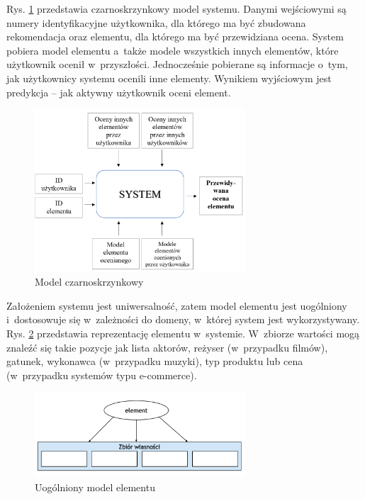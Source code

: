 \documentclass[twoside]{iisthesis}
\begin{document}
	Rys. \ref{fig:blackbox} przedstawia czarnoskrzynkowy model systemu. Danymi wejściowymi są numery identyfikacyjne użytkownika, dla którego ma być zbudowana rekomendacja oraz elementu, dla którego ma być przewidziana ocena. System pobiera model elementu a~także modele wszystkich innych elementów, które użytkownik ocenił w~przyszłości. Jednocześnie pobierane są informacje o~tym, jak użytkownicy systemu ocenili inne elementy. Wynikiem wyjściowym jest predykcja -- jak aktywny użytkownik oceni element.
	
	\begin{figure}[!ht] 
		\centering
		\includegraphics[width=0.7\textwidth]{blackbox}
		\caption{Model czarnoskrzynkowy}
		\label{fig:blackbox}
	\end{figure}
	
	Założeniem systemu jest uniwersalność, zatem model elementu jest uogólniony i~dostosowuje się w~zależności do domeny, w~której system jest wykorzystywany. Rys. \ref{fig:modelElementu} przedstawia reprezentację elementu w~systemie. W~zbiorze wartości mogą znaleźć się takie pozycje jak lista aktorów, reżyser (w~przypadku filmów), gatunek, wykonawca (w~przypadku muzyki), typ produktu lub cena (w~przypadku systemów typu e-commerce).
	
	\begin{figure}[!ht] 
		\centering
		\includegraphics[width=0.7\textwidth]{modelElementu}
		\caption{Uogólniony model elementu}
		\label{fig:modelElementu}
	\end{figure}
	
\end{document}
